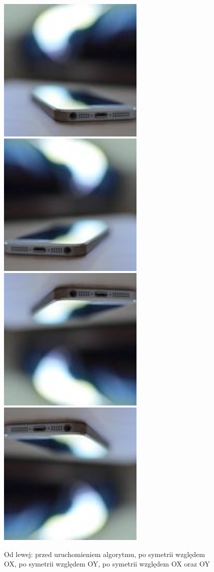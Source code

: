 \documentclass[a4paper,12pt]{book}
\begin{document}
\begin{figure}[H]
	\caption{Od lewej: przed uruchomieniem algorytmu, po symetrii względem OX, po symetrii względem OY, po symetrii względem OX oraz OY}
	\includegraphics[width=7cm, height=7cm]{phone-unmodified.jpg}
	\includegraphics[width=7cm, height=7cm]{4-4/axis-symmetry-True-False-phone.png}
	\includegraphics[width=7cm, height=7cm]{4-4/axis-symmetry-False-True-phone.png}
	\includegraphics[width=7cm, height=7cm]{4-4/axis-symmetry-True-True-phone.png}
\end{figure}
\end{document}
